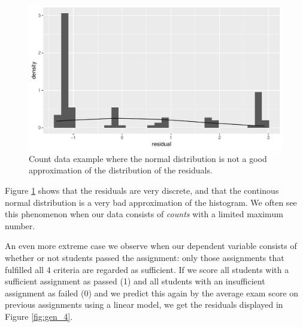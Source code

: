 \documentclass[]{book}\usepackage[]{graphicx}\usepackage[]{color}
\makeatletter
\def\maxwidth{ %
  \ifdim\Gin@nat@width>\linewidth
    \linewidth
  \else
    \Gin@nat@width
  \fi
}
\newenvironment{knitrout}{}{} %
\makeatother
\begin{document}
\begin{knitrout}
\color{fgcolor}\begin{figure}

{\centering \includegraphics[width=\maxwidth]{figure/gen_3-1} 

}

\caption[Count data example where the normal distribution is not a good approximation of the distribution of the residuals]{Count data example where the normal distribution is not a good approximation of the distribution of the residuals.}\label{fig:gen_3}
\end{figure}


\end{knitrout}


Figure \ref{fig:gen_3} shows that the residuals are very discrete, and that the continous normal distribution is a very bad approximation of the histogram. We often see this phenomenon when our data consists of \textit{counts} with a limited maximum number.

An even more extreme case we observe when our dependent variable consists of whether or not students passed the assignment: only those assignments that fulfilled all 4 criteria are regarded as sufficient. If we score all students with a sufficient assignment as passed (1) and all students with an insufficient assignment as failed (0) and we predict this again by the average exam score on previous assignments using a linear model, we get the residuals displayed in Figure \ref{fig:gen_4}.
\end{document}
